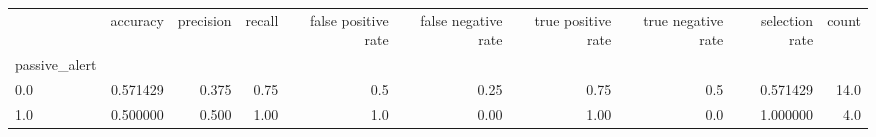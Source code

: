 \begin{tabular}{lrrrrrrrrr}
\toprule
{} &  accuracy &  precision &  recall &  false positive rate &  false negative rate &  true positive rate &  true negative rate &  selection rate &  count \\
passive\_alert &           &            &         &                      &                      &                     &                     &                 &        \\
\midrule
0.0           &  0.571429 &      0.375 &    0.75 &                  0.5 &                 0.25 &                0.75 &                 0.5 &        0.571429 &   14.0 \\
1.0           &  0.500000 &      0.500 &    1.00 &                  1.0 &                 0.00 &                1.00 &                 0.0 &        1.000000 &    4.0 \\
\bottomrule
\end{tabular}

